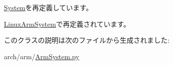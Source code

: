 \hyperlink{classSystem_1_1System_acce15679d830831b0bbe8ebc2a60b2ca}{System}を再定義しています。

\hyperlink{classArmSystem_1_1LinuxArmSystem_acce15679d830831b0bbe8ebc2a60b2ca}{LinuxArmSystem}で再定義されています。

このクラスの説明は次のファイルから生成されました:\begin{DoxyCompactItemize}
\item 
arch/arm/\hyperlink{ArmSystem_8py}{ArmSystem.py}\end{DoxyCompactItemize}
